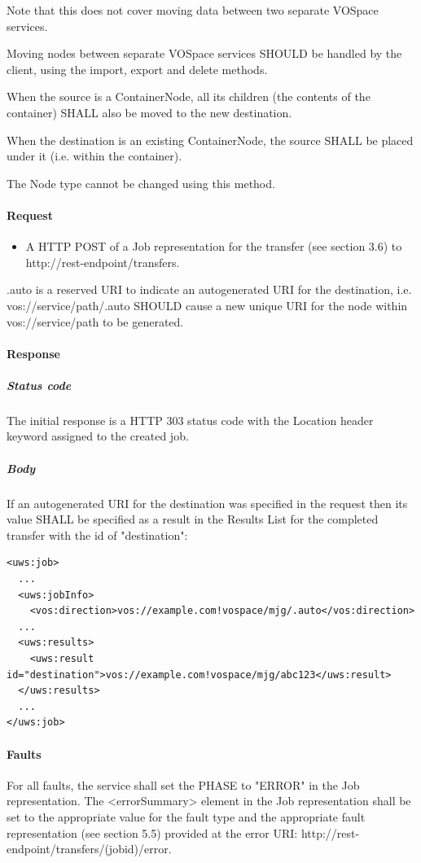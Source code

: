 \documentclass[11pt,a4paper]{ivoa}
\begin{document}
Note that this does not cover moving data between two separate VOSpace services.

Moving nodes between separate VOSpace services SHOULD be handled by the client, using the import, export and delete methods.

When the source is a ContainerNode, all its children (the contents of the container) SHALL also be moved to the new destination.

When the destination is an existing ContainerNode, the source SHALL be placed under it (i.e. within the container).

The Node type cannot be changed using this method.

\paragraph{Request}
\begin{itemize}
    \item A HTTP POST of a Job representation for the transfer (see section 3.6) to http://rest-endpoint/transfers.
\end{itemize}

.auto is a reserved URI to indicate an autogenerated URI for the destination, i.e. vos://service/path/.auto SHOULD cause a new unique URI for the node within vos://service/path to be generated.

\paragraph{Response}
\subparagraph{Status code} The initial response is a HTTP 303 status code with the Location header keyword assigned to the created job.
\subparagraph{Body}
If an autogenerated URI for the destination was specified in the request then its value SHALL be specified as a result in the Results List for the completed transfer with the id of "destination":
\begin{lstlisting}
<uws:job>
  ...
  <uws:jobInfo>
    <vos:direction>vos://example.com!vospace/mjg/.auto</vos:direction>
  ...
  <uws:results>
    <uws:result id="destination">vos://example.com!vospace/mjg/abc123</uws:result>
  </uws:results>
  ...
</uws:job>
\end{lstlisting}

\paragraph{Faults}

For all faults, the service shall set the PHASE to "ERROR" in the Job representation. The <errorSummary> element in the Job representation shall be set to the appropriate value for the fault type and the appropriate fault representation (see section 5.5) provided at the error URI: http://rest-endpoint/transfers/(jobid)/error.
\end{document}
